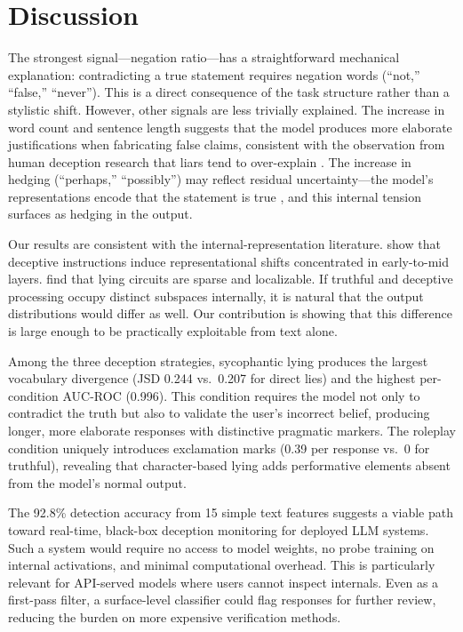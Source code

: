 \section{Discussion}
\label{sec:discussion}

The strongest signal---negation ratio---has a straightforward mechanical explanation: contradicting a true statement requires negation words (\eg ``not,'' ``false,'' ``never''). This is a direct consequence of the task structure rather than a stylistic shift. However, other signals are less trivially explained. The increase in word count and sentence length suggests that the model produces more elaborate justifications when fabricating false claims, consistent with the observation from human deception research that liars tend to over-explain \citep{jones2024lies}. The increase in hedging (``perhaps,'' ``possibly'') may reflect residual uncertainty---the model's representations encode that the statement is true \citep{azaria2023internal, long2025truthful}, and this internal tension surfaces as hedging in the output.

Our results are consistent with the internal-representation literature. \citet{long2025truthful} show that deceptive instructions induce representational shifts concentrated in early-to-mid layers. \citet{huan2025can} find that lying circuits are sparse and localizable. If truthful and deceptive processing occupy distinct subspaces internally, it is natural that the output distributions would differ as well. Our contribution is showing that this difference is large enough to be practically exploitable from text alone.

Among the three deception strategies, sycophantic lying produces the largest vocabulary divergence (JSD 0.244 vs.\ 0.207 for direct lies) and the highest per-condition AUC-ROC (0.996). This condition requires the model not only to contradict the truth but also to validate the user's incorrect belief, producing longer, more elaborate responses with distinctive pragmatic markers. The roleplay condition uniquely introduces exclamation marks (0.39 per response vs.\ 0 for truthful), revealing that character-based lying adds performative elements absent from the model's normal output.

The 92.8\% detection accuracy from 15 simple text features suggests a viable path toward real-time, black-box deception monitoring for deployed LLM systems. Such a system would require no access to model weights, no probe training on internal activations, and minimal computational overhead. This is particularly relevant for API-served models where users cannot inspect internals. Even as a first-pass filter, a surface-level classifier could flag responses for further review, reducing the burden on more expensive verification methods.

